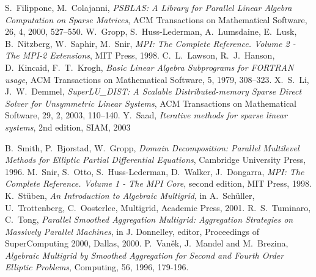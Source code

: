 \begin{thebibliography}{99}
%
S.~Filippone, M.~Colajanni, 
{\em PSBLAS: A Library for Parallel Linear Algebra
Computation on Sparse Matrices},
ACM Transactions on Mathematical Software, 26, 4, 2000, 527--550.
%
W.~Gropp, S.~Huss-Lederman, A.~Lumsdaine, E.~Lusk, B.~Nitzberg, W.~Saphir, M.~Snir, 
{\em MPI: The Complete Reference. Volume 2 - The MPI-2 Extensions},
MIT Press, 1998.
%
C.~L.~Lawson, R.~J.~Hanson, D.~Kincaid, F.~T.~Krogh,
\emph{Basic Linear Algebra Subprograms for FORTRAN usage},
ACM Transactions on Mathematical Software, 5, 1979, 308--323.
%
X.~S.~Li, J.~W.~Demmel, {\em SuperLU\_DIST: A Scalable Distributed-memory
Sparse Direct Solver for Unsymmetric Linear Systems},
ACM Transactions on Mathematical Software, 29, 2, 2003, 110--140.
%
%
%
%
Y.~Saad,
\emph{Iterative methods for sparse linear systems}, 2nd edition,
SIAM, 2003

B.~Smith, P.~Bjorstad, W.~Gropp,
{\em Domain Decomposition: Parallel Multilevel Methods for Elliptic
Partial Differential Equations},
Cambridge University Press, 1996.
%
M.~Snir, S.~Otto, S.~Huss-Lederman, D.~Walker, J.~Dongarra,
{\em MPI: The Complete Reference. Volume 1 - The MPI Core}, second edition,
MIT Press, 1998.
K.~St\"{u}ben,
{\em An Introduction to Algebraic Multigrid},
in A.~Sch\"{u}ller, U.~Trottenberg, C.~Oosterlee, Multigrid,
Academic Press, 2001.
%
R.~S.~Tuminaro, C.~Tong,
{\em Parallel Smoothed Aggregation Multigrid: Aggregation Strategies on Massively Parallel Machines},
in J. Donnelley, editor, Proceedings of SuperComputing 2000, Dallas, 2000.
%
P.~Van{\v e}k, J.~Mandel and M.~Brezina,
{\em Algebraic Multigrid by Smoothed Aggregation for Second and Fourth Order Elliptic Problems},
Computing, 56, 1996, 179-196.
%

\end{thebibliography}
